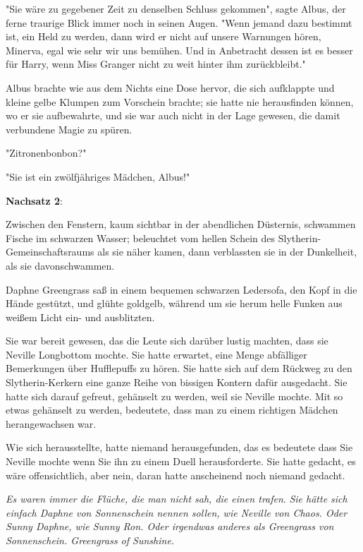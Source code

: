 {"Sie wäre zu gegebener Zeit zu denselben Schluss gekommen", sagte Albus, der ferne traurige Blick immer noch in seinen Augen. "Wenn jemand dazu bestimmt ist, ein Held zu werden, dann wird er nicht auf unsere Warnungen hören, Minerva, egal wie sehr wir uns bemühen. Und in Anbetracht dessen ist es besser für Harry, wenn Miss Granger nicht zu weit hinter ihm zurückbleibt."

Albus brachte wie aus dem Nichts eine Dose hervor, die sich aufklappte und kleine gelbe Klumpen zum Vorschein brachte; sie hatte nie herausfinden können, wo er sie aufbewahrte, und sie war auch nicht in der Lage gewesen, die damit verbundene Magie zu spüren.

"Zitronenbonbon?"

"Sie ist ein zwölfjähriges Mädchen, Albus!"

\textbf{Nachsatz 2}:

Zwischen den Fenstern, kaum sichtbar in der abendlichen Düsternis, schwammen Fische im schwarzen Wasser; beleuchtet vom hellen Schein des Slytherin-Gemeinschaftsraums als sie näher kamen, dann verblassten sie in der Dunkelheit, als sie davonschwammen.

Daphne Greengrass saß in einem bequemen schwarzen Ledersofa, den Kopf in die Hände gestützt, und glühte goldgelb, während um sie herum helle Funken aus weißem Licht ein- und ausblitzten.

Sie war bereit gewesen, das die Leute sich darüber lustig machten, dass sie Neville Longbottom mochte. Sie hatte erwartet, eine Menge abfälliger Bemerkungen über Hufflepuffs zu hören. Sie hatte sich auf dem Rückweg zu den Slytherin-Kerkern eine ganze Reihe von bissigen Kontern dafür ausgedacht. Sie hatte sich darauf gefreut, gehänselt zu werden, weil sie Neville mochte. Mit so etwas gehänselt zu werden, bedeutete, dass man zu einem richtigen Mädchen herangewachsen war.

Wie sich herausstellte, hatte niemand herausgefunden, das es bedeutete dass Sie Neville mochte wenn Sie ihn zu einem Duell herausforderte. Sie hatte gedacht, es wäre offensichtlich, aber nein, daran hatte anscheinend noch niemand gedacht.

\emph{Es waren immer die Flüche, die man nicht sah, die einen trafen}. \emph{Sie hätte sich einfach Daphne von Sonnenschein nennen sollen, wie Neville von Chaos. Oder Sunny Daphne, wie Sunny Ron. Oder irgendwas anderes als Greengrass von Sonnenschein. Greengrass of Sunshine.}

}
